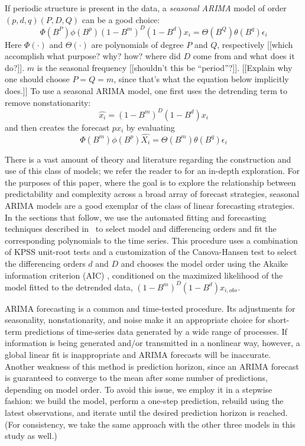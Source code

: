 If periodic structure is present in the data, a \emph{seasonal ARIMA}
model of order $(p,d,q)(P,D,Q)$ can be a good choice:
%
$$\Phi(B^P)\phi(B^p)(1-B^m)^D(1-B^d) x_i =
\Theta(B^Q)\theta(B^q)\epsilon_i$$
%
Here $\Phi(\cdot)$ and $\Theta(\cdot)$ are polynomials of degree $P$
and $Q$, respectively [[which accomplish what purpose?  why?  how?
    where did $D$ come from and what does it do?]].  $m$ is the
seasonal frequency [[shouldn't this be ``period''?]].  [[Explain why
    one should choose $P=Q=m$, since that's what the equation below
    implicitly does.]]  To use a seasonal ARIMA model, one first uses
the detrending term to remove nonstationarity: $$\hat{x_i} =
(1-B^m)^D(1-B^d) x_{i}$$ and then creates the forecast $px_i$ by
evaluating $$\Phi(B^m)\phi(B^p)\hat{X_i} =
\Theta(B^m)\theta(B^q)\epsilon_i$$

There is a vast amount of theory and literature regarding the
construction and use of this class of models; we refer the reader to
\cite{davislinearts} for an in-depth exploration.  For the purposes of
this paper, where the goal is to explore the relationship between
predictability and complexity across a broad array of forecast
strategies, seasonal ARIMA models are a good exemplar of the class of
linear forecasting strategies.  In the sections that follow, we use
the automated fitting and forecasting techniques described
in~\cite{autoARIMA} to select model and differencing orders and fit
the corresponding polynomials to the time series.  This procedure uses
a combination of KPSS unit-root tests \cite{KPSSunit} and a
customization of the Canova-Hansen test \cite{Canova1995} to select
the differencing orders $d$ and $D$ and chooses the model order using
the Akaike information criterion (AIC) \cite{akaike1974}, conditioned
on the maximized likelihood of the model fitted to the detrended data,
$(1-B^m)^D(1-B^d) x_{i,obs}$.

ARIMA forecasting is a common and time-tested procedure.  Its
adjustments for seasonality, nonstationarity, and noise make it an
appropriate choice for short-term predictions of time-series data
generated by a wide range of processes.  If information is being
generated and/or transmitted in a nonlinear way, however, a global
linear fit is inappropriate and ARIMA forecasts will be inaccurate.
Another weakness of this method is prediction horizon, since an ARIMA
forecast is guaranteed to converge to the mean after some number of
predictions, depending on model order.  To avoid this issue, we employ
it in a stepwise fashion: we build the model, perform a one-step
prediction, rebuild using the latest observations, and iterate until
the desired prediction horizon is reached.  (For consistency, we take
the same approach with the other three models in this study as well.)

